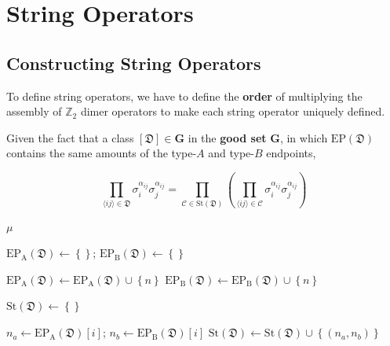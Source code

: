 \documentclass[12font]{article}
\theoremstyle{definition}
\newcommand{\anglelr}[1]{\langle #1 \rangle}
\newcommand{\lr}[1]{\left(  #1  \right)}
\newcommand{\lrm}[1]{\left[  #1  \right]}
\newcommand{\lrg}[1]{\left\{  #1  \right\}}
\newcommand{\abs}[1]{\left|  #1  \right|}
\newcommand{\mrm}[1]{\mathrm{#1}}
\newcommand{\bo}[1]{\mathbf{#1}}
\newcommand{\dimer}[2]{\sigma_{#1}^{\alpha_{#1#2}}\sigma_{#2}^{\alpha_{#1#2}}}
\begin{document}
\section{String Operators}

\subsection{Constructing String Operators}
To define string operators, we have to define the \textbf{order} of multiplying the assembly of $\mathbb{Z}_2$ dimer operators to make each string operator uniquely defined.

Given the fact that a class $[\mathfrak{D}]\in\bo{G}$ in the \textbf{good set} $\bo{G}$, in which $\mrm{EP}(\mathfrak{D})$ contains the same amounts of the type-$A$ and type-$B$ endpoints, 

\[
\prod_{\anglelr{ij}\in\mathfrak{D}}
    \dimer{i}{j}
=
\prod_{\mathcal{C} \in \mrm{St}(\mathfrak{D})}
\lr{
    \prod_{\anglelr{ij}\in\mathcal{C}}
    \dimer{i}{j}
}
\]

\begin{algorithm}[H]
\caption{Sorting lattice sites into $A$ and $B$ sublattices}\label{alg:AB-sorting}

    \begin{algorithmic}
        
            
            \State \Return $\mu$
        \EndFunction

        \State $\mrm{EP_A}(\mathfrak{D}) \gets \lrg{}$; $\mrm{EP_B}(\mathfrak{D}) \gets \lrg{}$ 

                \State $\mrm{EP_A}(\mathfrak{D}) \gets \mrm{EP_A}(\mathfrak{D}) \cup \lrg{n}$
                \State $\mrm{EP_B}(\mathfrak{D}) \gets \mrm{EP_B}(\mathfrak{D}) \cup \lrg{n}$
            \EndIf
        \EndFor
    \end{algorithmic}

\end{algorithm}

\begin{algorithm}[H]
\caption{Generate $\mrm{St}(\mathfrak{D})$}\label{alg:St-generator}

    \begin{algorithmic}
        \State $\mrm{St}(\mathfrak{D}) \gets \lrg{}$

        \For{$i=0$, $i \leq \abs{\mrm{EP}(\mathfrak{D})}/2$, $i$++}
            \State $n_a \gets \mrm{EP_A}(\mathfrak{D})\lrm{i}$; $n_b \gets \mrm{EP_B}(\mathfrak{D})\lrm{i}$
            \State $\mrm{St}(\mathfrak{D}) \gets \mrm{St}(\mathfrak{D}) \cup \lrg{(n_a,n_b)}$
        \EndFor
    \end{algorithmic}

\end{algorithm}
\end{document}
